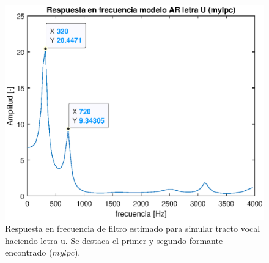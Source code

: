 \begin{figure}[H]
    \centering
    \includegraphics[width = .8\linewidth]{figures/p1_4u.eps}
    \caption{Respuesta en frecuencia de filtro estimado para simular tracto vocal haciendo letra u. Se destaca el primer y segundo formante encontrado ($mylpc$).}
    \label{fig:p1_4u}
\end{figure}




